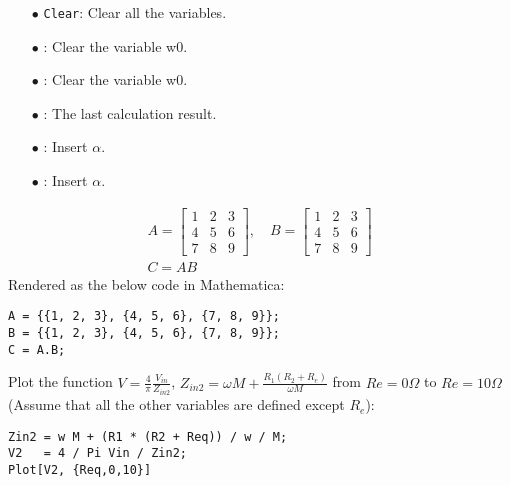 \documentclass[8pt]{innovativeinnovation-cheatsheet}
\newcommand{\myinline}[1]{{\color{innoinnored}\bfseries\ttfamily{#1}}}
\begin{document}
\begin{multicols*}{3}



\begin{enumerate}[leftmargin=*,nosep]
    \item[$\bullet$] \lstinline!Clear!\myinline{["`*"]}: Clear all the variables.
    \item[$\bullet$] \myinline{Clear[w0]}: Clear the variable w0.
    \item[$\bullet$] \myinline{w0=.}: Clear the variable w0.
    \item[$\bullet$] \myinline{\%}: The last calculation result.
    \item[$\bullet$] : Insert $\alpha$.
    \item[$\bullet$] \myinline{\textbackslash[Alpha]}: Insert $\alpha$.
\end{enumerate}

\begin{equation}
    \begin{gathered}
        A = \left[\begin{array}{ccc}
            1 & 2 & 3 \\
            4 & 5 & 6 \\
            7 & 8 & 9
        \end{array}\right],\quad
        B = \left[\begin{array}{ccc}
            1 & 2 & 3 \\
            4 & 5 & 6 \\
            7 & 8 & 9
        \end{array}\right]\\
        C= AB
    \end{gathered}
\end{equation}
Rendered as the below code in Mathematica:
\begin{lstlisting}
A = {{1, 2, 3}, {4, 5, 6}, {7, 8, 9}};
B = {{1, 2, 3}, {4, 5, 6}, {7, 8, 9}};
C = A.B;
\end{lstlisting}


Plot the function $V = \frac{4}{\pi}\frac{V_{in}}{Z_{in2}}$, $Z_{in2} =   \omega M + \frac{R_1 (R_2 + R_e)}{\omega M}
$ from $Re=0\Omega$ to $Re=10\Omega$ (Assume that all the other variables are defined except $R_e$):
\begin{lstlisting}
Zin2 = w M + (R1 * (R2 + Req)) / w / M;
V2   = 4 / Pi Vin / Zin2;
Plot[V2, {Req,0,10}]
\end{lstlisting}


\end{multicols*}
\end{document}
